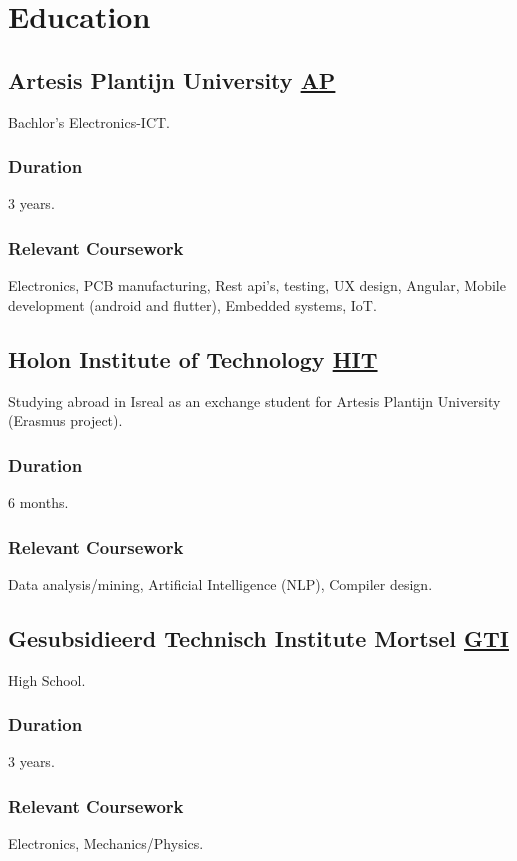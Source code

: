 \pagebreak

\section{Educat\textcolor{mycolor}{ion}}
  \subsection{Artesis Plantijn University \href{https://ap.be}{AP}}
    \hspace*{\fill}{\textcolor{mygrey}{2017-2020}}

    Bachlor's Electronics-ICT.
    \subsubsection{Duration}
      3 years.
    \subsubsection{Relevant Coursework}
      Electronics, PCB manufacturing, Rest api's, testing, UX design, Angular, Mobile development (android and flutter), Embedded systems, IoT.
  \subsection{Holon Institute of Technology \href{https://www.hit.ac.il/en}{HIT}}
    \hspace*{\fill}{\textcolor{mygrey}{2020}}

    Studying abroad in Isreal as an exchange student for Artesis Plantijn University (Erasmus project).
    \subsubsection{Duration}
      6 months.
    \subsubsection{Relevant Coursework}
      Data analysis/mining, Artificial Intelligence (NLP), Compiler design.

      
    \subsection{Gesubsidieerd Technisch Institute Mortsel \href{https://gtimortsel.be/}{GTI}}
    \hspace*{\fill}{\textcolor{mygrey}{2016}}
    
    High School.
    \subsubsection{Duration}
      3 years.
    \subsubsection{Relevant Coursework}
      Electronics, Mechanics/Physics.
